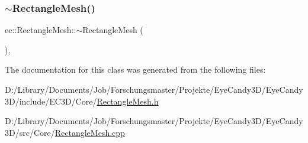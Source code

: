 \subsubsection{\texorpdfstring{$\sim$\+Rectangle\+Mesh()}{~RectangleMesh()}}
{\footnotesize\ttfamily ec\+::\+Rectangle\+Mesh\+::$\sim$\+Rectangle\+Mesh (\begin{DoxyParamCaption}{ }\end{DoxyParamCaption})\hspace{0.3cm}{\ttfamily [virtual]}, {\ttfamily [default]}}



The documentation for this class was generated from the following files\+:\begin{DoxyCompactItemize}
\item 
D\+:/\+Library/\+Documents/\+Job/\+Forschungsmaster/\+Projekte/\+Eye\+Candy3\+D/\+Eye\+Candy3\+D/include/\+E\+C3\+D/\+Core/\mbox{\hyperlink{_rectangle_mesh_8h}{Rectangle\+Mesh.\+h}}\item 
D\+:/\+Library/\+Documents/\+Job/\+Forschungsmaster/\+Projekte/\+Eye\+Candy3\+D/\+Eye\+Candy3\+D/src/\+Core/\mbox{\hyperlink{_rectangle_mesh_8cpp}{Rectangle\+Mesh.\+cpp}}\end{DoxyCompactItemize}
